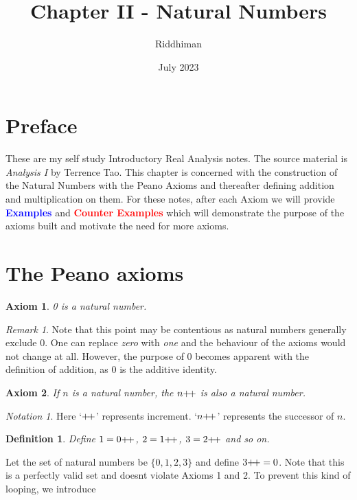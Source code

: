 \documentclass[12pt]{article}
\title{Chapter II - Natural Numbers}
\author{Riddhiman}
\date{July 2023}
\newtheorem{axiom}{Axiom}
\newtheorem{definition}{Definition}[section]
\theoremstyle{remark}
\newtheorem*{remark}{Remark}
\newtheorem*{notation}{Notation}
\begin{document}
\def\inc{{\mathrel+\joinrel\mathrel+}}  

\maketitle

\section{Preface}%
\label{sec:Preface}
These are my self study Introductory Real Analysis notes. The source material is \textit{Analysis I} by Terrence Tao. This chapter is concerned with the construction of the Natural Numbers with the Peano Axioms and thereafter defining addition and multiplication on them. For these notes, after each Axiom we will provide \textcolor{blue}{\textbf{Examples}} and \textcolor{red}{\textbf{Counter Examples}} which will demonstrate the purpose of the axioms built and motivate the need for more axioms.

\section{The Peano axioms}%
\label{sec:The Peano axioms}

\begin{axiom}
   0 is a natural number. 
\end{axiom}

\begin{remark}
    Note that this point may be contentious as natural numbers generally exclude $0$. One can replace \textit{zero} with \textit{one} and the behaviour of the axioms would not change at all. However, the purpose of $0$ becomes apparent with the definition of addition, as $0$ is the additive identity. 
\end{remark}

\begin{axiom}
	If $n$ is a natural number, the $n\inc$ is also a natural number.
\end{axiom}

\begin{notation}
	Here `$\inc$' represents increment. `$n\inc$' represents the successor of $n$. 
\end{notation}

\begin{definition}
   Define $1 = 0\inc$, $2 = 1\inc$, $3 = 2\inc$ and so on.  
\end{definition}


\begin{cexample}
	Let the set of natural numbers be $\{0, 1, 2, 3\}$ and define $3\inc = 0$. Note that this is a perfectly valid set and doesnt violate Axioms 1 and 2. To prevent this kind of looping, we introduce 
\end{cexample}
\end{document}
